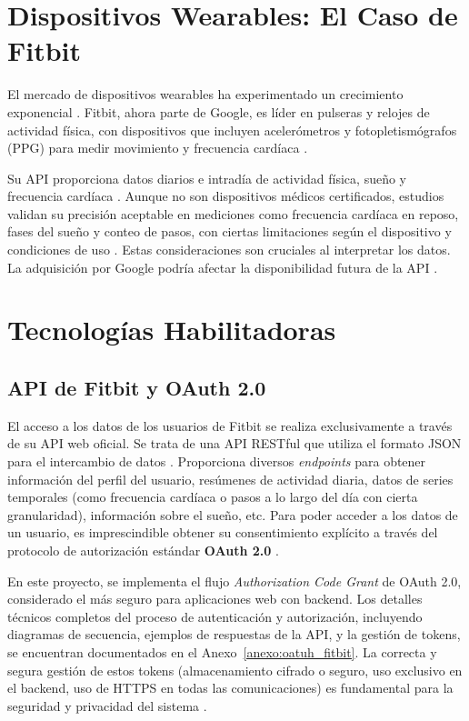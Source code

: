 \section{Dispositivos Wearables: El Caso de Fitbit}
\label{sec:ea_fitbit}

El mercado de dispositivos wearables ha experimentado un crecimiento exponencial \cite{fortune_wearable_market}. Fitbit\textsuperscript{\textregistered}, ahora parte de Google, es líder en pulseras y relojes de actividad física, con dispositivos que incluyen acelerómetros y fotopletismógrafos (PPG) para medir movimiento y frecuencia cardíaca \cite{fitbit_how_hr_works}.

Su API proporciona datos diarios e intradía de actividad física, sueño y frecuencia cardíaca \cite{fitbit_api_reference}. Aunque no son dispositivos médicos certificados, estudios validan su precisión aceptable en mediciones como frecuencia cardíaca en reposo, fases del sueño y conteo de pasos, con ciertas limitaciones según el dispositivo y condiciones de uso \cite{haghayegh2019accuracy, nelson2016validity}. Estas consideraciones son cruciales al interpretar los datos. La adquisición por Google podría afectar la disponibilidad futura de la API \cite{google_fitbit_acquisition_info}.
\section{Tecnologías Habilitadoras}
\label{sec:ea_tecnologias}

\subsection{API de Fitbit y OAuth 2.0}
\label{subsec:ea_fitbit_api_oauth}
El acceso a los datos de los usuarios de Fitbit\textsuperscript{\textregistered} se realiza exclusivamente a través de su API web oficial. Se trata de una API RESTful que utiliza el formato JSON para el intercambio de datos \cite{fitbit_api_reference}. Proporciona diversos \textit{endpoints} para obtener información del perfil del usuario, resúmenes de actividad diaria, datos de series temporales (como frecuencia cardíaca o pasos a lo largo del día con cierta granularidad), información sobre el sueño, etc. Para poder acceder a los datos de un usuario, es imprescindible obtener su consentimiento explícito a través del protocolo de autorización estándar \textbf{OAuth 2.0} \cite{oauth_spec_rfc6749}.

En este proyecto, se implementa el flujo \textit{Authorization Code Grant} de OAuth 2.0, considerado el más seguro para aplicaciones web con backend. Los detalles técnicos completos del proceso de autenticación y autorización, incluyendo diagramas de secuencia, ejemplos de respuestas de la API, y la gestión de tokens, se encuentran documentados en el Anexo~\ref{anexo:oatuh_fitbit}.
La correcta y segura gestión de estos tokens (almacenamiento cifrado o seguro, uso exclusivo en el backend, uso de HTTPS en todas las comunicaciones) es fundamental para la seguridad y privacidad del sistema \cite{oauth_security_bcp_rfc8252}.

